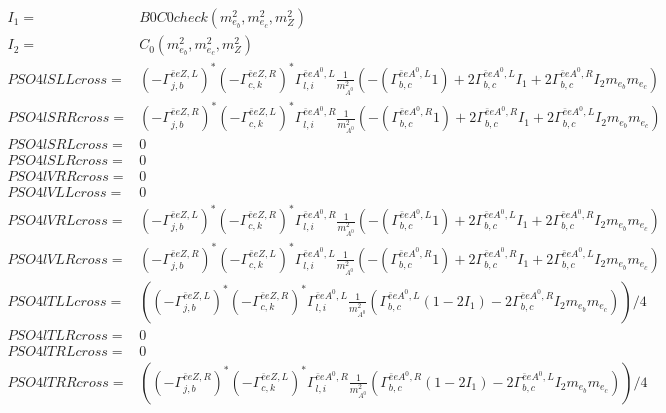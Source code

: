 \documentclass[A4,landscape]{article}
\begin{document}
\begin{align} 
I_1= & B0C0check(m^2_{e_{{b}}}, m^2_{e_{{c}}}, m^2_{Z}) \\ 
I_2= & C_0(m^2_{e_{{b}}}, m^2_{e_{{c}}}, m^2_{Z}) \\ 
  PSO4lSLLcross= &  (- \Gamma^{\bar{e}e Z ,L} _{j, b})^* (- \Gamma^{\bar{e}e Z ,R} _{c, k})^* \Gamma^{\bar{e}e A^0 ,L}_{l, i} \frac{1}{m^2_{A^0}} (-(\Gamma^{\bar{e}e A^0 ,L}_{b, c} 1) + 2 \Gamma^{\bar{e}e A^0 ,L}_{b, c} I_1 + 2 \Gamma^{\bar{e}e A^0 ,R}_{b, c} I_2 m_{e_{{b}}} m_{e_{{c}}}) \\ 
  PSO4lSRRcross= &  (- \Gamma^{\bar{e}e Z ,R} _{j, b})^* (- \Gamma^{\bar{e}e Z ,L} _{c, k})^* \Gamma^{\bar{e}e A^0 ,R}_{l, i} \frac{1}{m^2_{A^0}} (-(\Gamma^{\bar{e}e A^0 ,R}_{b, c} 1) + 2 \Gamma^{\bar{e}e A^0 ,R}_{b, c} I_1 + 2 \Gamma^{\bar{e}e A^0 ,L}_{b, c} I_2 m_{e_{{b}}} m_{e_{{c}}}) \\ 
  PSO4lSRLcross= & 0 \\ 
  PSO4lSLRcross= & 0 \\ 
  PSO4lVRRcross= & 0 \\ 
  PSO4lVLLcross= & 0 \\ 
  PSO4lVRLcross= &  (- \Gamma^{\bar{e}e Z ,L} _{j, b})^* (- \Gamma^{\bar{e}e Z ,R} _{c, k})^* \Gamma^{\bar{e}e A^0 ,R}_{l, i} \frac{1}{m^2_{A^0}} (-(\Gamma^{\bar{e}e A^0 ,L}_{b, c} 1) + 2 \Gamma^{\bar{e}e A^0 ,L}_{b, c} I_1 + 2 \Gamma^{\bar{e}e A^0 ,R}_{b, c} I_2 m_{e_{{b}}} m_{e_{{c}}}) \\ 
  PSO4lVLRcross= &  (- \Gamma^{\bar{e}e Z ,R} _{j, b})^* (- \Gamma^{\bar{e}e Z ,L} _{c, k})^* \Gamma^{\bar{e}e A^0 ,L}_{l, i} \frac{1}{m^2_{A^0}} (-(\Gamma^{\bar{e}e A^0 ,R}_{b, c} 1) + 2 \Gamma^{\bar{e}e A^0 ,R}_{b, c} I_1 + 2 \Gamma^{\bar{e}e A^0 ,L}_{b, c} I_2 m_{e_{{b}}} m_{e_{{c}}}) \\ 
  PSO4lTLLcross= & ( (- \Gamma^{\bar{e}e Z ,L} _{j, b})^* (- \Gamma^{\bar{e}e Z ,R} _{c, k})^* \Gamma^{\bar{e}e A^0 ,L}_{l, i} \frac{1}{m^2_{A^0}} (\Gamma^{\bar{e}e A^0 ,L}_{b, c} (1 - 2 I_1) - 2 \Gamma^{\bar{e}e A^0 ,R}_{b, c} I_2 m_{e_{{b}}} m_{e_{{c}}}))/4 \\ 
  PSO4lTLRcross= & 0 \\ 
  PSO4lTRLcross= & 0 \\ 
  PSO4lTRRcross= & ( (- \Gamma^{\bar{e}e Z ,R} _{j, b})^* (- \Gamma^{\bar{e}e Z ,L} _{c, k})^* \Gamma^{\bar{e}e A^0 ,R}_{l, i} \frac{1}{m^2_{A^0}} (\Gamma^{\bar{e}e A^0 ,R}_{b, c} (1 - 2 I_1) - 2 \Gamma^{\bar{e}e A^0 ,L}_{b, c} I_2 m_{e_{{b}}} m_{e_{{c}}}))/4 \\ 
\end{align} 
\end{document}
